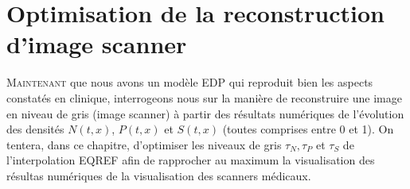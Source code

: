 \documentclass[main.tex]{subfiles}
\begin{document}
\chapter{Optimisation de la reconstruction d'image scanner}
\lettrine[lines=2, lhang=0.33, loversize=0.25]{M}{aintenant} que nous avons un modèle EDP qui reproduit bien les aspects constatés en clinique, interrogeons nous sur la manière de reconstruire une image en niveau de gris (image scanner) à partir des résultats numériques \ie de l'évolution des densités $N(t,x)$, $P(t,x)$ et $S(t,x)$ (toutes comprises entre 0 et 1). On tentera, dans ce chapitre, d'optimiser les niveaux de gris $\tau_N, \tau_P$ et $\tau_S$ de l'interpolation EQREF  afin de rapprocher au maximum la visualisation des résultas numériques de la visualisation des scanners médicaux.
\end{document}
